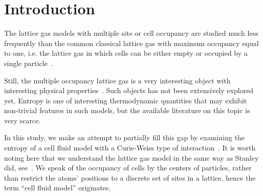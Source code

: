 \documentclass[entropy,article,submit,pdftex,moreauthors]{Definitions/mdpi}
\begin{document}

\section{Introduction}

The lattice gas models with multiple site or cell occupancy are studied much less frequently than the common classical lattice gas with maximum occupancy equal to one, i.e. the lattice gas in which cells can be either empty or occupied by a single particle~\citep{LY52,Stanley71}.

Still, the multiple occupancy lattice gas is a very interesting object with interesting physical properties~\citep{LWL98,FHL04,FL18,LYZ21}. 
Such objects has not been extensively explored yet. Entropy is one of interesting thermodynamic quantities that may exhibit non-trivial features in such models, but the available literature on this topic is very scarce.

In this study, we make an attempt to partially fill this gap by examining the entropy of a cell fluid model with a Curie-Weiss type of interaction~\citep{KKD20,KD22,RDKPS25arxiv}. It is worth noting here that we understand the lattice gas model in the same way as Stanley did, see~\citep[Appendix A]{Stanley71}. We speak of the occupancy of cells by the centers of particles, rather than restrict the atoms' positions to a discrete set of sites in a lattice, hence the term ``cell fluid model'' originates.

\end{document}
